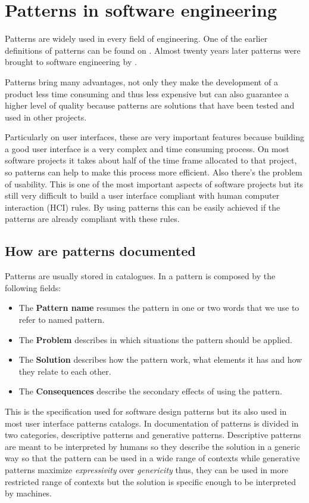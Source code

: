 \section{Patterns in software engineering}
\label{section:Patterns_in_software_engineering}
Patterns are widely used in every field of engineering. One of the earlier definitions of patterns can be found on \cite{A_Pattern_Language_Towns_Buildings_Construction}. Almost twenty years later patterns were brought to software engineering by \cite{Design_Patterns}.

Patterns bring many advantages, not only they make the development of a product less time consuming and thus less expensive but can also guarantee a higher level of quality because patterns are solutions that have been tested and used in other projects.

Particularly on user interfaces, these are very important features because building a good user interface is a very complex and time consuming process. On most software projects it takes about half of the time frame allocated to that project, so patterns can help to make this process more efficient. Also there's the problem of usability. This is one of the most important aspects of software projects but its still very difficult to build a user interface compliant with human computer interaction (HCI) rules. By using patterns this can be easily achieved if the patterns are already compliant with these rules.

\subsection{How are patterns documented}
Patterns are usually stored in catalogues. In \cite{Design_Patterns} a pattern is composed by the following fields:
\begin{itemize}
\item The \textbf{Pattern name} resumes the pattern in one or two words that we use to refer to named pattern.
\item The \textbf{Problem} describes in which situations the pattern should be applied.
\item The \textbf{Solution} describes how the pattern work, what elements it has and how they relate to each other.
\item The \textbf{Consequences} describe the secondary effects of using the pattern.
\end{itemize}
This is the specification used for software design patterns but its also used in most user interface patterns catalogs.
In \cite{Generative_pattern-based_design_of_user_interfaces} documentation of patterns is divided in two categories, descriptive patterns and generative patterns. Descriptive patterns are meant to be interpreted by humans so they describe the solution in a generic way so that the pattern can be used in a wide range of contexts while generative patterns maximize \textit{expressivity} over \textit{genericity} thus, they can be used in more restricted range of contexts but the solution is specific enough to be interpreted by machines. 

